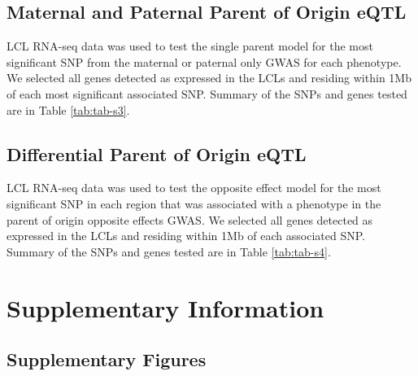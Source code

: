 \subsection{Maternal and Paternal Parent of Origin eQTL}\label{Maternal and Paternal Parent of Origin Parent of Origin eQTL}

LCL RNA-seq data was used to test the single parent model for the most significant SNP from the maternal or paternal only GWAS for each phenotype. We selected all genes detected as expressed in the LCLs and residing within 1Mb of each most significant associated SNP. Summary of the SNPs and genes tested are in Table \ref{tab:tab-s3}.

\subsection{Differential Parent of Origin eQTL}\label{Differential Parent of Origin eQTL}

LCL RNA-seq data was used to test the opposite effect model for the most significant SNP in each region that was associated with a phenotype in the parent of origin opposite effects GWAS. We selected all genes detected as expressed in the LCLs and residing within 1Mb of each associated SNP. Summary of the SNPs and genes tested are in Table \ref{tab:tab-s4}.

\clearpage
\section{Supplementary Information}\label{fig-supplementary-information}

\subsection{Supplementary Figures}\label{fig-supplementary-figures}
\renewcommand\theContinuedFloat{\alph{ContinuedFloat}}
 
